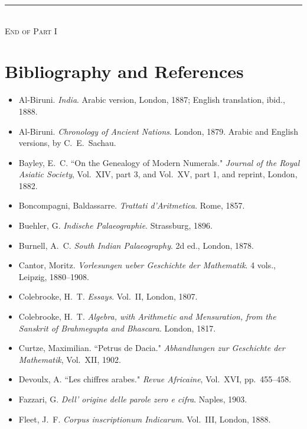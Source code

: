 \documentclass[11pt,a4paper]{article}
\begin{document}
\vfill
\begin{center}
\rule{0.5\textwidth}{0.4pt}\\[0.5cm]
{\small \textsc{End of Part I}}
\end{center}

\newpage

\section*{Bibliography and References}

\begin{footnotesize}
\begin{itemize}[leftmargin=2em,label={},itemsep=0.5ex]
\item Al-Biruni. \textit{India}. Arabic version, London, 1887; English translation, ibid., 1888.
\item Al-Biruni. \textit{Chronology of Ancient Nations}. London, 1879. Arabic and English versions, by C.~E.~Sachau.
\item Bayley, E.~C. ``On the Genealogy of Modern Numerals." \textit{Journal of the Royal Asiatic Society}, Vol.~XIV, part 3, and Vol.~XV, part 1, and reprint, London, 1882.
\item Boncompagni, Baldassarre. \textit{Trattati d'Aritmetica}. Rome, 1857.
\item Buehler, G. \textit{Indische Palaeographie}. Strassburg, 1896.
\item Burnell, A.~C. \textit{South Indian Palaeography}. 2d ed., London, 1878.
\item Cantor, Moritz. \textit{Vorlesungen ueber Geschichte der Mathematik}. 4 vols., Leipzig, 1880--1908.
\item Colebrooke, H.~T. \textit{Essays}. Vol.~II, London, 1807.
\item Colebrooke, H.~T. \textit{Algebra, with Arithmetic and Mensuration, from the Sanskrit of Brahmegupta and Bhascara}. London, 1817.
\item Curtze, Maximilian. ``Petrus de Dacia." \textit{Abhandlungen zur Geschichte der Mathematik}, Vol.~XII, 1902.
\item Devoulx, A. ``Les chiffres arabes." \textit{Revue Africaine}, Vol.~XVI, pp.~455--458.
\item Fazzari, G. \textit{Dell' origine delle parole zero e cifra}. Naples, 1903.
\item Fleet, J.~F. \textit{Corpus inscriptionum Indicarum}. Vol.~III, London, 1888.

\end{itemize}
\end{footnotesize}
\end{document}
